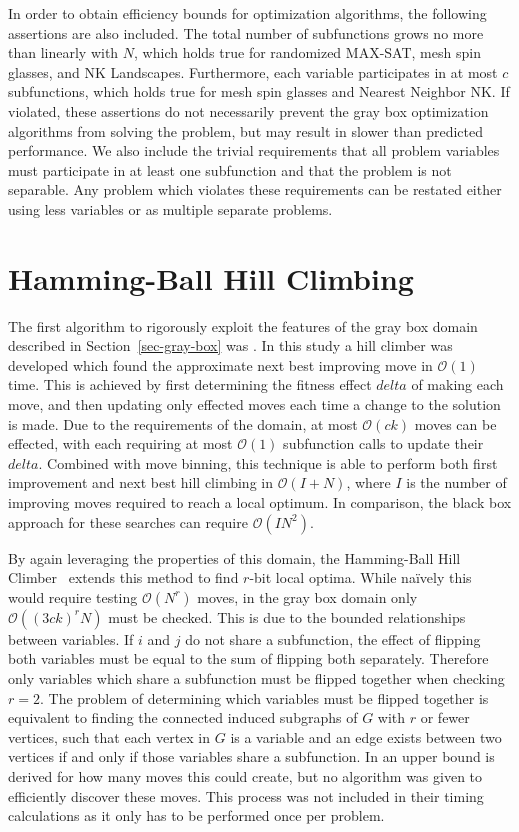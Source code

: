 \documentclass{sig-alternate}
\newcommand{\BigO}[1]{$\mathcal{O}{(#1)}$}
\begin{document}
In order to obtain efficiency bounds for optimization algorithms, the following
assertions are also included. The total number of subfunctions grows no more than
linearly with $N$, which holds true for randomized MAX-SAT, mesh spin glasses, and NK Landscapes.
Furthermore, each variable participates in at most $c$ subfunctions, which holds true
for mesh spin glasses and Nearest Neighbor NK. If violated, these assertions do not
necessarily prevent the gray box optimization algorithms from solving the problem, but may result
in slower than predicted performance.
We also include the trivial requirements that all problem variables must participate
in at least one subfunction and that the problem is not separable. Any problem which
violates these requirements can be restated either using less variables or as multiple separate problems.

\section{Hamming-Ball Hill Climbing}
\label{sec-hamming}
The first algorithm to rigorously exploit the features of the gray box domain
described in Section~\ref{sec-gray-box} was \cite{whitley:2013:greedy}. In this study
a hill climber was developed which found the approximate next best improving move in \BigO{1} time.
This is achieved by first determining the fitness effect $delta$ of making each move, and then updating
only effected moves each time a change to the solution is made. Due to the requirements of the domain,
at most \BigO{ck} moves can be effected, with each requiring at most \BigO{1} subfunction calls
to update their $delta$. Combined with move binning, this technique is able to perform both
first improvement and next best hill climbing in \BigO{I+N}, where $I$ is the number of improving
moves required to reach a local optimum. In comparison, the black box approach for these searches can require
\BigO{IN^2}.

By again leveraging the properties of this domain, the Hamming-Ball Hill Climber~\cite{chicano:2014:ball} extends this
method to find $r$-bit local optima. While na\"ively this would require testing \BigO{N^r} moves, in the gray box domain only
\BigO{(3ck)^rN} must be checked. This is due to the bounded relationships between variables.
If $i$ and $j$ do not share a subfunction, the effect of flipping both variables
must be equal to the sum of flipping both separately. Therefore only variables which share
a subfunction must be flipped together when checking $r=2$. The problem of determining
which variables must be flipped together is equivalent to finding the connected induced
subgraphs of $G$ with $r$ or fewer vertices, such that each vertex in $G$ is a variable
and an edge exists between two vertices if and only if those variables share a subfunction.
In \cite{chicano:2014:ball} an upper bound is derived for how many moves this could create,
but no algorithm was given to efficiently discover these moves. This process was not included
in their timing calculations as it only has to be performed once per problem.
\end{document}
